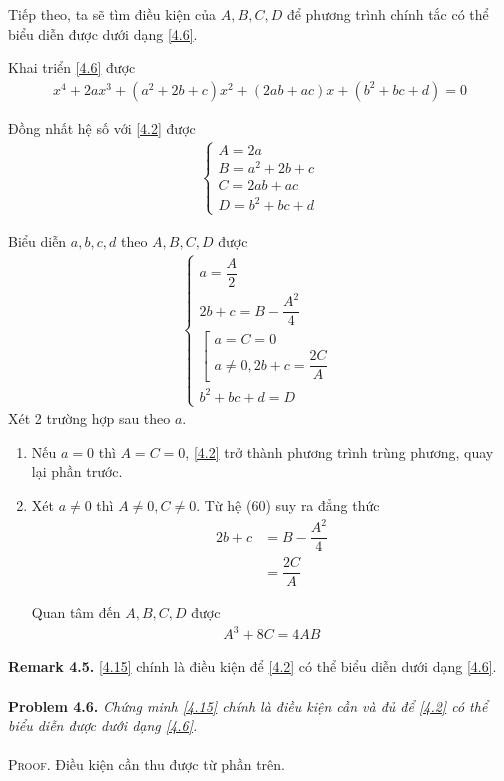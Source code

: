 \documentclass[a4paper,oneside]{book}
\numberwithin{equation}{chapter}
\begin{document}
Tiếp theo, ta sẽ tìm điều kiện của $A,B,C,D$ để phương trình chính tắc có thể biểu diễn được dưới dạng \eqref{4.6}.

Khai triển \eqref{4.6} được 
\begin{align}
{x^4} + 2a{x^3} + \left( {{a^2} + 2b + c} \right){x^2} + \left( {2ab + ac} \right)x + \left( {{b^2} + bc + d} \right) = 0
\end{align}

Đồng nhất hệ số với \eqref{4.2} được 
\begin{align}
\left\{ {\begin{array}{*{20}{c}}
{A = 2a}\\
{B = {a^2} + 2b + c}\\
{C = 2ab + ac}\\
{D = {b^2} + bc + d}
\end{array}} \right.
\end{align}

Biểu diễn $a,b,c,d$ theo $A,B,C,D$ được
\begin{align}
\left\{ {\begin{array}{*{20}{c}}
{a = \dfrac{A}{2}}\\
{2b + c = B - \dfrac{{{A^2}}}{4}}\\
{\left[ {\begin{array}{*{20}{c}}
{a = C = 0}\\
{a \ne 0,2b + c = \dfrac{{2C}}{A}}
\end{array}} \right.}\\
{{b^2} + bc + d = D}
\end{array}} \right.
\end{align}
Xét 2 trường hợp sau theo $a$.
\begin{enumerate}
\item Nếu $a=0$ thì $A = C = 0$, \eqref{4.2} trở thành phương trình trùng phương, quay lại phần trước.
\item Xét $a \ne 0$ thì $A \ne 0,C \ne 0$. Từ hệ (60) suy ra đẳng thức
\begin{align}
2b + c &= B - \dfrac{{{A^2}}}{4} \\
&= \dfrac{{2C}}{A}
\end{align}

Quan tâm đến $A,B,C,D$ được
\begin{align}
\label{4.15}
{A^3} + 8C = 4AB
\end{align}
\end{enumerate}
\textbf{Remark 4.5. } \eqref{4.15} chính là điều kiện để \eqref{4.2} có thể biểu diễn dưới dạng \eqref{4.6}.\\
\\
\textbf{Problem 4.6.} \textit{Chứng minh \eqref{4.15} chính là điều kiện cần và đủ để \eqref{4.2} có thể biểu diễn được dưới dạng \eqref{4.6}.}\\
\\
\textsc{Proof.} Điều kiện cần thu được từ phần trên.
\end{document}
